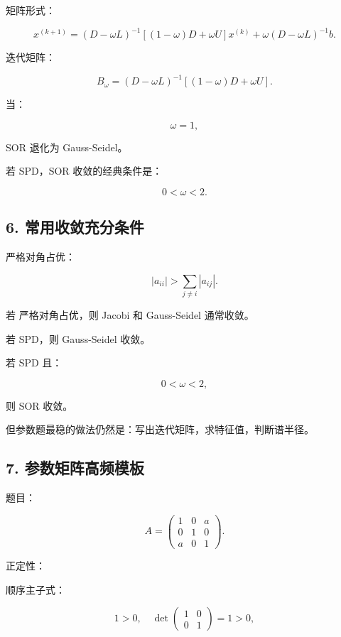 \documentclass[11pt,a4paper]{ctexart}
\newcommand{\code}[1]{\begingroup\ttfamily\small #1\endgroup}
\begin{document}
矩阵形式：

\[
x^{(k+1)}
=(D-\omega L)^{-1}[(1-\omega)D+\omega U]x^{(k)}
+\omega(D-\omega L)^{-1}b.
\]

迭代矩阵：

\[
B_\omega=(D-\omega L)^{-1}[(1-\omega)D+\omega U].
\]

当：

\[
\omega=1,
\]

SOR 退化为 Gauss-Seidel。

若 \code{} SPD，SOR 收敛的经典条件是：

\[
0<\omega<2.
\]


\subsection*{6. 常用收敛充分条件}


严格对角占优：

\[
|a_{ii}|>\sum_{j\ne i}|a_{ij}|.
\]

若 \code{} 严格对角占优，则 Jacobi 和 Gauss-Seidel 通常收敛。

若 \code{} SPD，则 Gauss-Seidel 收敛。

若 \code{} SPD 且：

\[
0<\omega<2,
\]

则 SOR 收敛。

但参数题最稳的做法仍然是：写出迭代矩阵，求特征值，判断谱半径。


\subsection*{7. 参数矩阵高频模板}


题目：

\[
A=\begin{pmatrix}1&0&a\\0&1&0\\a&0&1\end{pmatrix}.
\]

正定性：

顺序主子式：

\[
1>0,\quad
\det\begin{pmatrix}1&0\\0&1\end{pmatrix}=1>0,
\]
\end{document}
